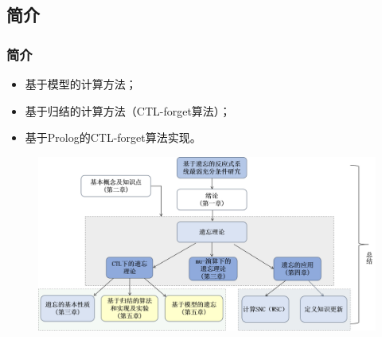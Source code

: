 \documentclass[9pt, CJK]{beamer}
\begin{document}
\subsection{简介}
\begin{frame}
	\frametitle{简介}
	\begin{itemize}
		\item 基于模型的计算方法；
		\item 基于归结的计算方法（CTL-forget算法）；
		\item 基于Prolog的CTL-forget算法实现。
	\end{itemize}
\begin{figure}
	\includegraphics[scale=0.3]{figures/frameF5}
\end{figure}
\end{frame}
\end{document}
